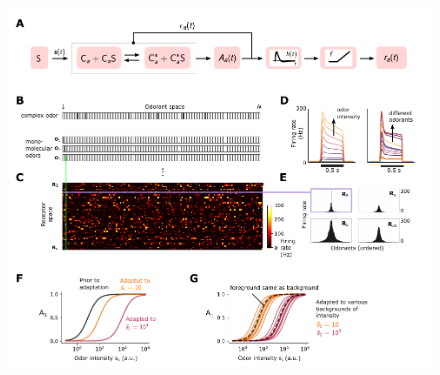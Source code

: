\documentclass[10pt,prl,aps,showpacs,twocolumn,unsortedaddress,showkeys,linenumbers]{revtex4-1}
\begin{document}
\begin{figure}[!tb]
	\centering
	\begin{subfigure}[t]{\linewidth}
		\label{fig:tuning_curves_a}
	\end{subfigure}
	\begin{subfigure}[t]{0\linewidth}
		\label{fig:tuning_curves_b}
	\end{subfigure}
	\begin{subfigure}[t]{0\linewidth}
		\label{fig:tuning_curves_c}
	\end{subfigure}
	\begin{subfigure}[t]{0\linewidth}
		\label{fig:tuning_curves_d}
	\end{subfigure}
	\begin{subfigure}[t]{0\linewidth}
		\label{fig:tuning_curves_e}
	\end{subfigure}
	\begin{subfigure}[t]{0\linewidth}
		\label{fig:tuning_curves_f}
	\end{subfigure}
	\begin{subfigure}[t]{0\linewidth}
		\label{fig:tuning_curves_g}
	\end{subfigure}
	\includegraphics[width=\linewidth]{figures/1_tuning_curves}
	\caption{\footnotesize{
}}
\end{figure}
\end{document}
